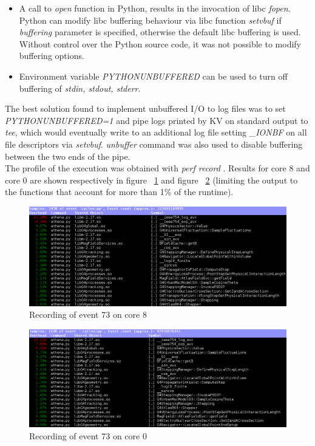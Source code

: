 \documentclass[a4paper]{jpconf}
\begin{document}
\begin{itemize}
\item A call to \textit{open} function in Python, results in the invocation
of libc \textit{fopen}. Python can modify libc buffering behaviour via libc 
function \textit{setvbuf} if \textit{buffering} parameter is specified, 
otherwise the default libc buffering is used. Without control over the Python
source code, it was not possible to modify buffering options.
\item Environment variable \textit{PYTHONUNBUFFERED} can be used to turn off
buffering of \textit{stdin, stdout, stderr}.
\end{itemize}
The best solution found to implement unbuffered I/O to log files was to set 
\textit{PYTHONUNBUFFERED=1} and pipe logs printed by KV on standard output to
\textit{tee}, which would eventually write to an additional log file setting 
\textit{\_IONBF} on all file descriptors via \textit{setvbuf}.
\textit{unbuffer} command was also used to disable buffering between the two
ends of the pipe. 
\\
The profile of the execution was obtained with \textit{perf record} . 
Results for core 8 
and core 0 are shown respectively in figure ~\ref{event-73-processor8} and 
figure ~\ref{event-73-processor0} (limiting the output to the functions that
account for more than 1\% of the runtime). 

\begin{figure}[h]
\begin{center}
\includegraphics[scale=0.45]{images/Event73_Processor8.png}
\end{center}
\caption{\label{event-73-processor8} Recording of event 73 on core 8}
\end{figure}

\begin{figure}[h]
\begin{center}
\includegraphics[scale=0.45]{images/Event73_Processor0.png}
\end{center}
\caption{\label{event-73-processor0} Recording of event 73 on core 0}
\end{figure}
\end{document}
